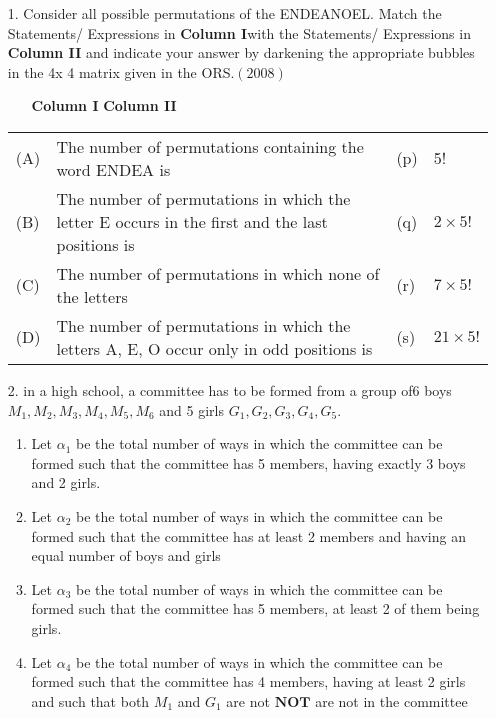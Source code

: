 \documentclass[journal,12pt,twocolumn]{IEEEtran}
\theoremstyle{remark}
\begin{document}
\begin{enumerate}
    \item[1. \hspace{0.5cm}] Consider all possible permutations of the ENDEANOEL. Match the Statements/ Expressions in
\textbf{Column I}with the Statements/ Expressions in \textbf{Column II} and indicate your answer by darkening
the appropriate bubbles in the 4x 4 matrix given in the ORS.\hfill$(2008)$\\ \begin{enumerate}
    \item[] \textbf{Column I} \hspace{10cm} \textbf{Column II}
    \vspace{0.8cm}
\end{enumerate}
\begin{tabular}{p{0.5cm}p{9cm}p{2.5cm}p{2cm}}
 (A) & The number of permutations containing the word ENDEA is & \hspace{2cm}(p) & 5! \\
    (B) & The number of permutations in which the letter E occurs in the first and the last positions is & \hspace{2cm}(q) & $2\times{5!}$\\
    (C)& The number of permutations in which none of the letters & \hspace{2cm}(r) &$7\times{5!}$\\
    (D) & The number of permutations in which the letters A, E, O occur only in odd positions is & \hspace{2cm}(s) & $21\times{5!}$
    
\end{tabular}
\vspace{0.5cm}
\item[2.\hspace{0.5cm}] in a high school, a committee has to be formed from a group of6 boys $M_1,M_2,M_3,M_4,M_5,M_6$ and 5 girls $G_1,G_2,G_3,G_4,G_5$.
\begin{enumerate}
    \item Let $\alpha_1$ be the total number of ways in which the committee can be formed such that the committee has 5 members, having exactly 3 boys and 2 girls. 
    \item Let $\alpha_2$ be the total number of ways in which the committee can be formed such that the committee has at least 2 members and having an equal number of boys and girls
    \item Let $\alpha_3$ be the total number of ways in which the committee can be formed such that the committee has 5 members, at least 2 of them being girls. 
    \item Let $\alpha_4$ be the total number of ways in which the committee can be formed such that the committee has 4 members, having at least 2 girls and such that both $M_1$ and $G_1$ are not $\mathbf{NOT} $ are not in the committee
\end{enumerate}



    
\end{enumerate}
\end{document}
